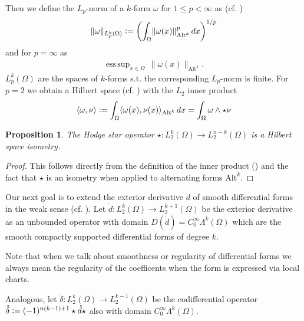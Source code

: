 \documentclass[12pt,a4paper]{article}
\numberwithin{equation}{subsection}
\numberwithin{lemma}{subsection}
\newtheorem{proposition}[lemma]{Proposition}
\theoremstyle{definition}
\DeclareMathOperator*{\esssup}{ess\,sup}
\newcommand{\smoothcompforms}[2]{C_0^\infty \Lambda^{#1}(#2)}
\begin{document}
Then
we define the $L_p$-norm of a $k$-form $\omega$ for $1\leq p < \infty$
as (cf. \cite{goldshtein})
\begin{align*}
\lVert \omega \rVert _{L_p^k(\Omega)}\vcentcolon=
\left(\int_\Omega \lVert \omega(x) \rVert _{\text{Alt}^k}^p \,dx \right)^{1/p}
\end{align*}
and for $p=\infty$ as
\begin{align*}
\esssup_{x\in \Omega} \, \lVert \omega(x) \rVert _{\text{Alt}^k}.
\end{align*}
$L_p^k(\Omega)$ are the spaces of $k$-forms 
s.t. the corresponding $L_p$-norm is finite.
For $p=2$ we obtain a Hilbert space (cf. \cite[Sec. 6.2.6]{arnold}) 
with the $L_2$ inner product  
\begin{align}
    \langle \omega, \nu \rangle \vcentcolon= 
    \int_\Omega \langle \omega(x), \nu(x) \rangle _{\text{Alt}^k} \,dx
    = \int_\Omega \omega \wedge \star \nu
    \label{eq:def_inner_product} 
\end{align}
\begin{proposition}
    The Hodge star operator $\star:L^k_2(\Omega) \rightarrow L^{n-k}_2(\Omega)$ is a
    Hilbert space isometry.
\end{proposition}
\begin{proof}
    This follows directly from the definition of the inner product 
    () and the fact that $\star$ is an isometry 
    when applied to alternating forms $\text{Alt}^k$.
\end{proof}


Our next goal is to extend the exterior derivative $d$ 
of smooth differential forms in the weak sense (cf. \cite{goldshtein}). 
Let $\mathring{d}: L^k_2(\Omega) \rightarrow L^{k+1}_2(\Omega)$ be the exterior
derivative as an unbounded operator with domain 
$D(\mathring{d}) = \smoothcompforms{k}{\Omega}$ 
which are the smooth compactly supported differential forms of degree $k$. 

Note that when we talk about smoothness or regularity of differential forms we
always mean the regularity of the coefficents when the form is expressed 
via local charts. 

Analogous, let 
$\mathring{\delta}: L^k_2(\Omega) \rightarrow L^{k-1}_2(\Omega)$ be the 
codifferential operator $\mathring{\delta} \vcentcolon= 
(-1)^{n(k-1)+1}\star\mathring{d}\star$ 
also with domain $\smoothcompforms{k}{\Omega}$. 
\end{document}
